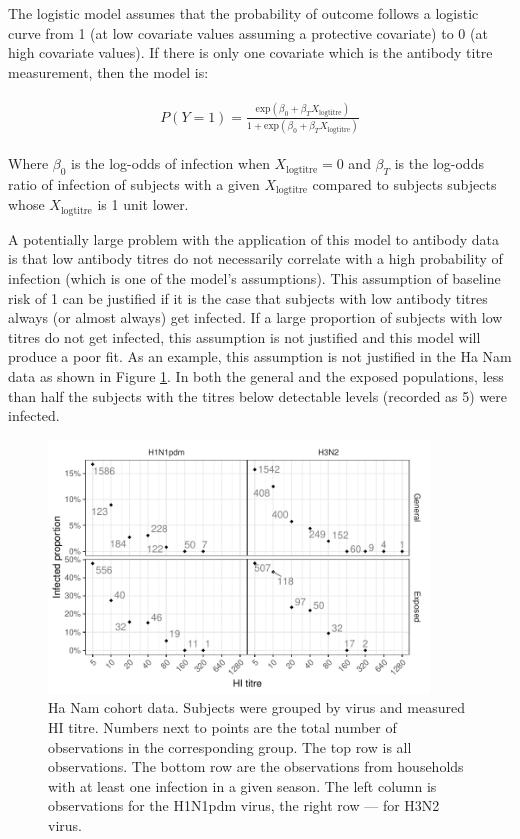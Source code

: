 The logistic model assumes that the probability of outcome follows a logistic curve from 1 (at low covariate values assuming a protective covariate) to 0 (at high covariate values). If there is only one covariate which is the antibody titre measurement, then the model is:

\begin{align*}
\begin{gathered}
P(Y=1) = \frac{\text{exp}(\beta_0 + \beta_T X_{\text{logtitre}})}{1 + \text{exp}(\beta_0 + \beta_T X_{\text{logtitre}})}
\end{gathered}
\end{align*}

Where $\beta_0$ is the log-odds of infection when $X_{\text{logtitre}}=0$ and $\beta_T$ is the log-odds ratio of infection of subjects with a given $X_{\text{logtitre}}$ compared to subjects subjects whose $X_{\text{logtitre}}$ is 1 unit lower. 

A potentially large problem with the application of this model to antibody data is that low antibody titres do not necessarily correlate with a high probability of infection (which is one of the model's assumptions). This assumption of baseline risk of 1 can be justified if it is the case that subjects with low antibody titres always (or almost always) get infected. If a large proportion of subjects with low titres do not get infected, this assumption is not justified and this model will produce a poor fit. As an example, this assumption is not justified in the Ha Nam data as shown in Figure \ref{HanamCounts}. In both the general and the exposed populations, less than half the subjects with the titres below detectable levels (recorded as 5) were infected. %

\begin{figure}[htp]
	\centering
	\includegraphics[width=0.9\textwidth]{../data-plot/hanam-hi-summ-light.pdf}
	\caption{
	Ha Nam cohort data. Subjects were grouped by virus and measured HI titre. Numbers next to points are the total number of observations in the corresponding group. The top row is all observations. The bottom row are the observations from households with at least one infection in a given season. The left column is observations for the H1N1pdm virus, the right row --- for H3N2 virus.
	}
	\label{HanamCounts}
\end{figure}

